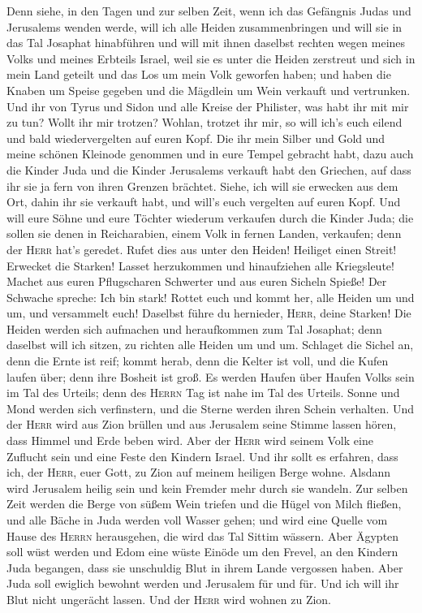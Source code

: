  Denn siehe, in den Tagen und zur selben Zeit, wenn ich
das Gefängnis Judas und Jerusalems wenden werde,  will ich
alle Heiden zusammenbringen und will sie in das Tal Josaphat hinabführen
und will mit ihnen daselbst rechten wegen meines Volks und meines
Erbteils Israel, weil sie es unter die Heiden zerstreut und sich in mein
Land geteilt  und das Los um mein Volk geworfen haben; und
haben die Knaben um Speise gegeben und die Mägdlein um Wein verkauft und
vertrunken.  Und ihr von Tyrus und Sidon und alle Kreise
der Philister, was habt ihr mit mir zu tun? Wollt ihr mir trotzen?
Wohlan, trotzet ihr mir, so will ich's euch eilend und bald
wiedervergelten auf euren Kopf.  Die ihr mein Silber und
Gold und meine schönen Kleinode genommen und in eure Tempel gebracht
habt,  dazu auch die Kinder Juda und die Kinder Jerusalems
verkauft habt den Griechen, auf dass ihr sie ja fern von ihren Grenzen
brächtet.  Siehe, ich will sie erwecken aus dem Ort, dahin
ihr sie verkauft habt, und will's euch vergelten auf euren Kopf.
 Und will eure Söhne und eure Töchter wiederum verkaufen
durch die Kinder Juda; die sollen sie denen in Reicharabien, einem Volk
in fernen Landen, verkaufen; denn der \textsc{Herr} hat's geredet.
 Rufet dies aus unter den Heiden! Heiliget einen Streit!
Erwecket die Starken! Lasset herzukommen und hinaufziehen alle
Kriegsleute!  Machet aus euren Pflugscharen Schwerter und
aus euren Sicheln Spieße! Der Schwache spreche: Ich bin stark!
 Rottet euch und kommt her, alle Heiden um und um, und
versammelt euch! Daselbst führe du hernieder, \textsc{Herr}, deine
Starken!  Die Heiden werden sich aufmachen und
heraufkommen zum Tal Josaphat; denn daselbst will ich sitzen, zu richten
alle Heiden um und um.  Schlaget die Sichel an, denn die
Ernte ist reif; kommt herab, denn die Kelter ist voll, und die Kufen
laufen über; denn ihre Bosheit ist groß.  Es werden
Haufen über Haufen Volks sein im Tal des Urteils; denn des
\textsc{Herrn} Tag ist nahe im Tal des Urteils.  Sonne
und Mond werden sich verfinstern, und die Sterne werden ihren Schein
verhalten.  Und der \textsc{Herr} wird aus Zion brüllen
und aus Jerusalem seine Stimme lassen hören, dass Himmel und Erde beben
wird. Aber der \textsc{Herr} wird seinem Volk eine Zuflucht sein und
eine Feste den Kindern Israel.  Und ihr sollt es
erfahren, dass ich, der \textsc{Herr}, euer Gott, zu Zion auf meinem
heiligen Berge wohne. Alsdann wird Jerusalem heilig sein und kein
Fremder mehr durch sie wandeln.  Zur selben Zeit werden
die Berge von süßem Wein triefen und die Hügel von Milch fließen, und
alle Bäche in Juda werden voll Wasser gehen; und wird eine Quelle vom
Hause des \textsc{Herrn} herausgehen, die wird das Tal Sittim wässern.
 Aber Ägypten soll wüst werden und Edom eine wüste Einöde
um den Frevel, an den Kindern Juda begangen, dass sie unschuldig Blut in
ihrem Lande vergossen haben.  Aber Juda soll ewiglich
bewohnt werden und Jerusalem für und für.  Und ich will
ihr Blut nicht ungerächt lassen. Und der \textsc{Herr} wird wohnen zu
Zion.
